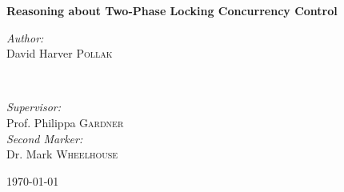 \begin{titlepage}
\vspace*{\fill}
    \begin{center}
        \huge
        \textbf{Reasoning about Two-Phase Locking Concurrency Control}
        
        \vspace{1.5cm}
        
        \begin{minipage}{0.4\textwidth}
			\begin{flushleft} \large
				\emph{Author:}\\
				David Harver \textsc{Pollak}
			\end{flushleft}
		\end{minipage}
			~
		\begin{minipage}{0.4\textwidth}
			\begin{flushright} \large
			\emph{Supervisor:} \\
			Prof. Philippa \textsc{Gardner} \\
			\vspace{0.5cm}
			\emph{Second Marker:} \\
			Dr. Mark \textsc{Wheelhouse}
			\end{flushright}
		\end{minipage}
		
		 \vspace{1.5cm}
		
		{\large \today}
    \end{center}
\vspace*{\fill}
\end{titlepage}
